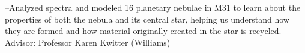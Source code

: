 \begin{itemize}
{%
--Analyzed spectra and modeled 16 planetary nebulae in M31 to learn about the properties of both the nebula and its central star, helping us understand how they are formed and how material originally created in the star is recycled. Advisor: Professor Karen Kwitter (Williams)\\}
 

\end{itemize}
